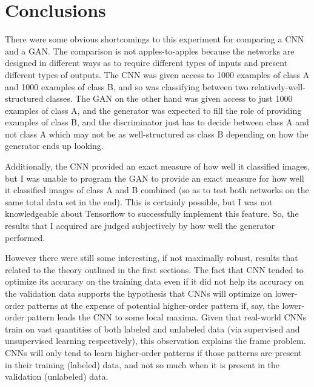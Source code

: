 \documentclass{article}
\begin{document}
\section{Conclusions}

There were some obvious shortcomings to this experiment for comparing a CNN and a GAN.
The comparison is not apples-to-apples because the networks are designed in different ways as to require different types of inputs and present different types of outputs.
The CNN was given access to 1000 examples of class A and 1000 examples of class B, and so was classifying between two relatively-well-structured classes.
The GAN on the other hand was given access to just 1000 examples of class A, and the generator was expected to fill the role of providing examples of class B, and the discriminator just has to decide between class A and not class A which may not be as well-structured as class B depending on how the generator ends up looking.

Additionally, the CNN provided an exact measure of how well it classified images, but I was unable to program the GAN to provide an exact measure for how well it classified images of class A and B combined (so as to test both networks on the same total data set in the end).
This is certainly possible, but I was not knowledgeable about Tensorflow to successfully implement this feature.
So, the results that I acquired are judged subjectively by how well the generator performed.

However there were still some interesting, if not maximally robust, results that related to the theory outlined in the first sections.
The fact that CNN tended to optimize its accuracy on the training data even if it did not help its accuracy on the validation data supports the hypothesis that CNNs will optimize on lower-order patterns at the expense of potential higher-order pattern if, say, the lower-order pattern leads the CNN to some local maxima.
Given that real-world CNNs train on vast quantities of both labeled and unlabeled data (via supervised and unsupervised learning respectively), this observation explains the frame problem.
CNNs will only tend to learn higher-order patterns if those patterns are present in their training  (labeled) data, and not so much when it is present in the validation (unlabeled) data.
\end{document}
